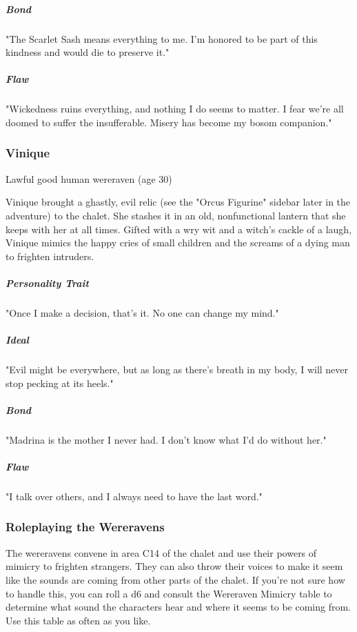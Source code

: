 \documentclass[10pt,a4paper,twoside,bg=print,twocolumn,openany,nodeprecatedcode]{dndbook}
\begin{document}
\subparagraph{Bond}
"The Scarlet Sash means everything to me. I'm honored to be part of this kindness and would die to preserve it."

\subparagraph{Flaw}
"Wickedness ruins everything, and nothing I do seems to matter. I fear we're all doomed to suffer the insufferable. Misery has become my bosom companion."

\subsubsection{Vinique}
Lawful good human wereraven (age 30)

Vinique brought a ghastly, evil relic (see the "Orcus Figurine" sidebar later in the adventure) to the chalet. She stashes it in an old, nonfunctional lantern that she keeps with her at all times. Gifted with a wry wit and a witch's cackle of a laugh, Vinique mimics the happy cries of small children and the screams of a dying man to frighten intruders.

\subparagraph{Personality Trait}
"Once I make a decision, that's it. No one can change my mind."

\subparagraph{Ideal}
"Evil might be everywhere, but as long as there's breath in my body, I will never stop pecking at its heels."

\subparagraph{Bond}
"Madrina is the mother I never had. I don't know what I'd do without her."

\subparagraph{Flaw}
"I talk over others, and I always need to have the last word."

\subsubsection{Roleplaying the Wereravens}
The wereravens convene in area C14 of the chalet and use their powers of mimicry to frighten strangers. They can also throw their voices to make it seem like the sounds are coming from other parts of the chalet. If you're not sure how to handle this, you can roll a d6 and consult the Wereraven Mimicry table to determine what sound the characters hear and where it seems to be coming from. Use this table as often as you like.
\end{document}

